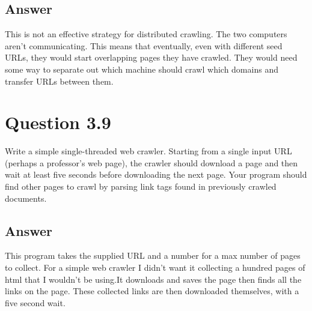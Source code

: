 \documentclass{article}
\begin{document}
\subsection*{Answer}

This is not an effective strategy for distributed crawling. The two computers aren't communicating. This means that eventually, even with different seed URLs, 
they would start overlapping pages they have crawled. They would need some way to separate out which machine should crawl which domains and transfer URLs between them.


\section{Question 3.9}
Write a simple single-threaded web crawler. Starting from a single input URL
(perhaps a professor’s web page), the crawler should download a page and then
wait at least five seconds before downloading the next page. Your program should
find other pages to crawl by parsing link tags found in previously crawled documents.

\subsection*{Answer}




This program takes the supplied URL and a number for a max number of pages to collect. For a simple web crawler I didn't want it collecting a hundred pages of html that I wouldn't be using.It downloads and saves the page then finds all the links on the page. These collected links are then downloaded themselves, with a five second wait.
\end{document}
